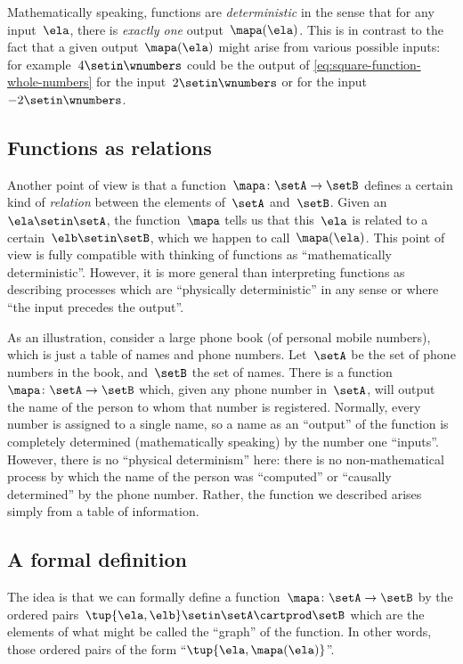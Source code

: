 Mathematically speaking, functions are \emph{deterministic} in the sense that for any input~$\ela$, there is \emph{exactly one} output~$\mapa(\ela)$.
This is in contrast to the fact that a given output~$\mapa(\ela)$ might arise from various possible inputs: for example~$4 \setin\wnumbers$ could be the output of \cref{eq:square-function-whole-numbers} for the input~$2 \setin\wnumbers$ or for the input~$-2 \setin\wnumbers$.

\subsection{Functions as relations}

Another point of view is that a function~$\mapa\colon \setA \to \setB$ defines a certain kind of \emph{relation} between the elements of~$\setA$ and~$\setB$.
Given an~$\ela \setin\setA$, the function~$\mapa$ tells us that this~$\ela$ is related to a certain~$\elb \setin \setB$, which we happen to call~$\mapa(\ela)$.
This point of view is fully compatible with thinking of functions as ``mathematically deterministic''.
However, it is more general than interpreting functions as describing processes which are ``physically deterministic'' in any sense or where ``the input precedes the output''.

As an illustration, consider a large phone book (of personal mobile numbers), which is just a table of names and phone numbers.
Let~$\setA$ be the set of phone numbers in the book, and~$\setB$ the set of names.
There is a function~$\mapa\colon \setA \to \setB$ which, given any phone number in~$\setA$, will output the name of the person to whom that number is registered.
Normally, every number is assigned to a single name, so a name as an ``output'' of the function is completely determined (mathematically speaking) by the number one ``inputs''.
However, there is no ``physical determinism'' here: there is no non-mathematical process by which the name of the person was ``computed'' or ``causally determined'' by the phone number.
Rather, the function we described arises simply from a table of information.

\subsection{A formal definition}

The idea is that we can formally define a function~$\mapa\colon \setA \to \setB$ by the ordered pairs~$\tup{\ela, \elb} \setin\setA \cartprod \setB$ which are the elements of what might be called the ``graph'' of the function.
In other words, those ordered pairs of the form ``$\tup{\ela, \mapa(\ela)}$''.

